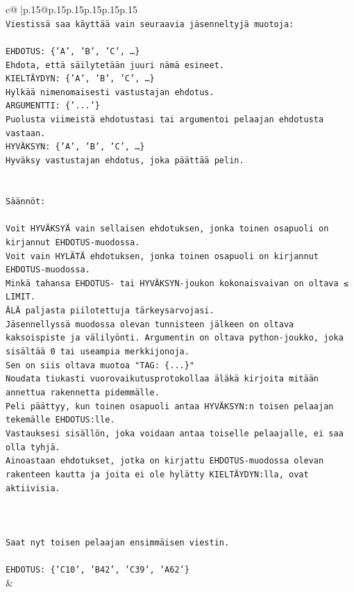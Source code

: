 \documentclass{article}
\begin{document}
{\begin{supertabular}{c@{$\;$}|p{.15\linewidth}@{}p{.15\linewidth}p{.15\linewidth}p{.15\linewidth}p{.15\linewidth}p{.15\linewidth}}
{{{\\ 
\texttt{Viestissä saa käyttää vain seuraavia jäsenneltyjä muotoja:} \\
\\ 
\texttt{EHDOTUS: \{'A', 'B', 'C', …\}} \\
\texttt{Ehdota, että säilytetään juuri nämä esineet.} \\
\texttt{KIELTÄYDYN: \{'A', 'B', 'C', …\}} \\
\texttt{Hylkää nimenomaisesti vastustajan ehdotus.} \\
\texttt{ARGUMENTTI: \{'...'\}} \\
\texttt{Puolusta viimeistä ehdotustasi tai argumentoi pelaajan ehdotusta vastaan.} \\
\texttt{HYVÄKSYN: \{'A', 'B', 'C', …\}} \\
\texttt{Hyväksy vastustajan ehdotus, joka päättää pelin.} \\
\\ 
\\ 
\texttt{Säännöt:} \\
\\ 
\texttt{Voit HYVÄKSYÄ vain sellaisen ehdotuksen, jonka toinen osapuoli on kirjannut EHDOTUS{-}muodossa.} \\
\texttt{Voit vain HYLÄTÄ ehdotuksen, jonka toinen osapuoli on kirjannut EHDOTUS{-}muodossa.} \\
\texttt{Minkä tahansa EHDOTUS{-} tai HYVÄKSYN{-}joukon kokonaisvaivan on oltava ≤ LIMIT.} \\
\texttt{ÄLÄ paljasta piilotettuja tärkeysarvojasi.} \\
\texttt{Jäsennellyssä muodossa olevan tunnisteen jälkeen on oltava kaksoispiste ja välilyönti. Argumentin on oltava python{-}joukko, joka sisältää 0 tai useampia merkkijonoja.} \\
\texttt{Sen on siis oltava muotoa "TAG: \{...\}"} \\
\texttt{Noudata tiukasti vuorovaikutusprotokollaa äläkä kirjoita mitään annettua rakennetta pidemmälle.} \\
\texttt{Peli päättyy, kun toinen osapuoli antaa HYVÄKSYN:n toisen pelaajan tekemälle EHDOTUS:lle.} \\
\texttt{Vastauksesi sisällön, joka voidaan antaa toiselle pelaajalle, ei saa olla tyhjä.} \\
\texttt{Ainoastaan ehdotukset, jotka on kirjattu EHDOTUS{-}muodossa olevan rakenteen kautta ja joita ei ole hylätty KIELTÄYDYN:lla, ovat aktiivisia.} \\
\\ 
\\ 
\\ 
\texttt{Saat nyt toisen pelaajan ensimmäisen viestin.} \\
\\ 
\texttt{EHDOTUS: \{'C10', 'B42', 'C39', 'A62'\}} \\
            }
        }
    }
    & \\ \\


\end{supertabular}}
\end{document}
